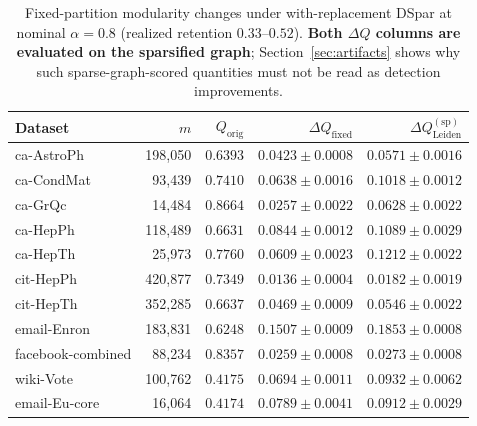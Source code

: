 \begin{table}[t]
\centering
\caption{Fixed-partition modularity changes under with-replacement DSpar at nominal $\alpha = 0.8$ (realized retention $0.33$--$0.52$).
\textbf{Both $\Delta Q$ columns are evaluated on the sparsified graph}; Section~\ref{sec:artifacts} shows why such sparse-graph-scored quantities must not be read as detection improvements.}
\label{tab:exp1_2_modularity}
\begin{tabular}{lrrrr}
\toprule
Dataset & $m$ & $Q_{\mathrm{orig}}$ & $\Delta Q_{\mathrm{fixed}}$ & $\Delta Q_{\mathrm{Leiden}}^{\mathrm{(sp)}}$ \\
\midrule
ca-AstroPh\cite{leskovec2007graph} & 198,050 & $0.6393$ & $0.0423 \pm 0.0008$ & $0.0571 \pm 0.0016$ \\
ca-CondMat\cite{leskovec2007graph}& 93,439 & $0.7410$ & $0.0638 \pm 0.0016$ & $0.1018 \pm 0.0012$ \\
ca-GrQc\cite{leskovec2007graph} & 14,484 & $0.8664$ & $0.0257 \pm 0.0022$ & $0.0628 \pm 0.0022$ \\
ca-HepPh\cite{leskovec2007graph} & 118,489 & $0.6631$ & $0.0844 \pm 0.0012$ & $0.1089 \pm 0.0029$ \\
ca-HepTh\cite{leskovec2007graph} & 25,973 & $0.7760$ & $0.0609 \pm 0.0023$ & $0.1212 \pm 0.0022$ \\
cit-HepPh\cite{leskovec2007graph} & 420,877 & $0.7349$ & $0.0136 \pm 0.0004$ & $0.0182 \pm 0.0019$ \\
cit-HepTh\cite{leskovec2007graph} & 352,285 & $0.6637$ & $0.0469 \pm 0.0009$ & $0.0546 \pm 0.0022$ \\
email-Enron\cite{leskovec2009community} & 183,831 & $0.6248$ & $0.1507 \pm 0.0009$ & $0.1853 \pm 0.0008$ \\
facebook-combined\cite{leskovec2012learning} & 88,234 & $0.8357$ & $0.0259 \pm 0.0008$ & $0.0273 \pm 0.0008$ \\
wiki-Vote\cite{leskovec2010signed} & 100,762 & $0.4175$ & $0.0694 \pm 0.0011$ & $0.0932 \pm 0.0062$ \\
email-Eu-core\cite{yin2017local} & 16,064 & $0.4174$ & $0.0789 \pm 0.0041$ & $0.0912 \pm 0.0029$ \\
\bottomrule
\end{tabular}
\end{table}

